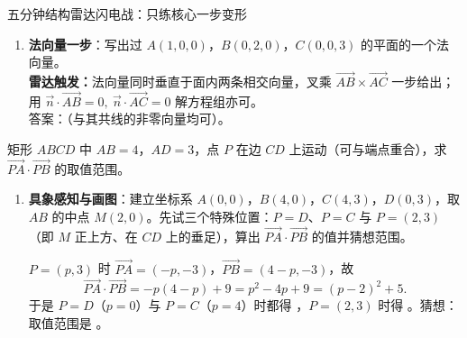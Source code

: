 \begin{warmupbox}{五分钟结构雷达闪电战：只练核心一步变形}
\begin{enumerate}[label=(\arabic*), itemsep=5pt]
\item \textbf{法向量一步}：写出过 $A(1,0,0)$，$B(0,2,0)$，$C(0,0,3)$ 的平面的一个法向量。\\
{\small\bfseries\textcolor{third}{雷达触发：}}法向量同时垂直于面内两条相交向量，叉乘 $\overrightarrow{AB}\times\overrightarrow{AC}$ 一步给出；用 $\vec n\cdot\overrightarrow{AB}=0,\ \vec n\cdot\overrightarrow{AC}=0$ 解方程组亦可。\\
答案：（与其共线的非零向量均可）。
\end{enumerate}
\end{warmupbox}


\begin{tcolorbox}[
  breakable, enhanced, sharp corners,
  colback=structurecolor!3, colframe=structurecolor!70!black, boxrule=0.6pt,
  title={\bfseries 解答即笔记·五问连环母题一：矩形边上一点的极化恒等式},
  coltitle=black, fonttitle=\small,
  attach boxed title to top left={xshift=2mm, yshift=-2mm},
  boxed title style={sharp corners, colback=white,
    colframe=structurecolor!70!black, boxrule=0.4pt},
  top=7pt]

矩形 $ABCD$ 中 $AB=4$，$AD=3$，点 $P$ 在边 $CD$ 上运动（可与端点重合），求 $\overrightarrow{PA}\cdot\overrightarrow{PB}$ 的取值范围。

\begin{enumerate}[label=(\arabic*), itemsep=4pt]
\item \textbf{具象感知与画图}：建立坐标系 $A(0,0)$，$B(4,0)$，$C(4,3)$，$D(0,3)$，取 $AB$ 的中点 $M(2,0)$。先试三个特殊位置：$P=D$、$P=C$ 与 $P=(2,3)$（即 $M$ 正上方、在 $CD$ 上的垂足），算出 $\overrightarrow{PA}\cdot\overrightarrow{PB}$ 的值并猜想范围。

$P=(p,3)$ 时 $\overrightarrow{PA}=(-p,-3)$，$\overrightarrow{PB}=(4-p,-3)$，故
\[
\overrightarrow{PA}\cdot\overrightarrow{PB}=-p(4-p)+9=p^2-4p+9=(p-2)^2+5 .
\]
于是 $P=D$（$p=0$）与 $P=C$（$p=4$）时都得 ，$P=(2,3)$ 时得 。猜想：取值范围是 \tk{[5,9]}。


\end{enumerate}
\end{tcolorbox}

